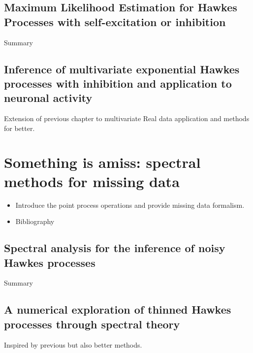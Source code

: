     \subsection{Maximum Likelihood Estimation for Hawkes Processes with self-excitation or inhibition}
    Summary

    \subsection{Inference of multivariate exponential Hawkes processes with inhibition and application to neuronal activity}
    Extension of previous chapter to multivariate
    Real data application and methods for better.


\section{Something is amiss: spectral methods for missing data}\label{sec:chap0_missing_data}
    \begin{itemize}
        \item Introduce the point process operations and provide missing data formalism. 
        \item Bibliography
    \end{itemize}
    \subsection{Spectral analysis for the inference of noisy Hawkes processes}
    Summary
    
    \subsection{A numerical exploration of thinned Hawkes processes through spectral theory}
    Inspired by previous but also better methods.


